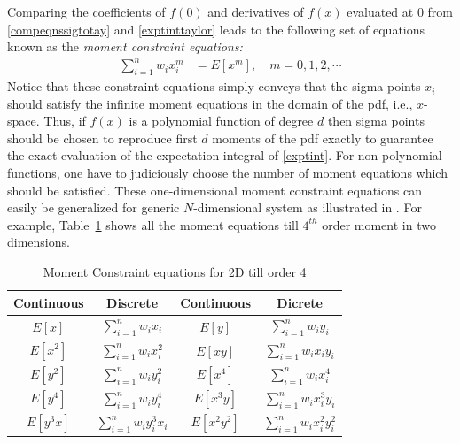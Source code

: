 \documentclass[letterpaper, 10 pt, conference]{IEEEtran}  %
\begin{document}
 Comparing the coefficients of $f(0)$ and derivatives of $f(x)$ evaluated at $0$ from \eqref{compeqnssigtotay} and \eqref{exptinttaylor} leads to the following set of equations known as the \textit{moment constraint equations:} 
\begin{align}
\sum_{i=1}^n{w_ix_i^m}&{}={}E[{x}^m], \quad  m=0,1,2,\cdots \label{momentconst}
\end{align}
Notice that these constraint equations simply  conveys that the sigma points $x_i$ should satisfy the infinite moment equations in the domain of the pdf, i.e., $x$-space. Thus, if $f(x)$ is a polynomial function of degree $d$ then sigma points should be chosen to reproduce first $d$ moments of the pdf exactly to guarantee the exact evaluation of the expectation integral of \eqref{exptint}. For non-polynomial functions, one have to judiciously choose the number of moment equations which should be satisfied. These one-dimensional moment constraint equations can easily be generalized for generic $N$-dimensional system as illustrated in \cite{jul1}. 
For example, Table~\ref{moment_match} shows all the moment equations till $4^{th}$ order moment in two dimensions.
\begin{table}
\caption{Moment Constraint equations for 2D till order 4}\vspace{-0.15in}
\label{moment_match}
\begin{center}
\begin{tabular}{|c|c||c|c|}
\hline
Continuous & Discrete & Continuous & Dicrete\\
\hline
$E[x]$ & $\sum_{i=1}^n{w_ix_i}$& $E[y]$ & $\sum_{i=1}^n{w_iy_i}$\\
\hline
$E[x^2]$ & $\sum_{i=1}^n{w_ix_i^2}$& $E[xy]$ & $\sum_{i=1}^n{w_ix_iy_i}$\\
\hline
$E[y^2]$ & $\sum_{i=1}^n{w_iy_i^2}$& $E[x^4]$ & $\sum_{i=1}^n{w_ix_i^4}$ \\
\hline
$E[y^4]$ & $\sum_{i=1}^n{w_iy_i^4}$& $E[x^3y]$ & $\sum_{i=1}^n{w_ix_i^3y_i}$\\
\hline
$E[y^3x]$ & $\sum_{i=1}^n{w_iy_i^3x_i}$ & $E[x^2y^2]$ & $\sum_{i=1}^n{w_ix_i^2y_i^2}$\\
\hline
\end{tabular}
\end{center}\vspace{-0.2in}
\end{table}
\end{document}
